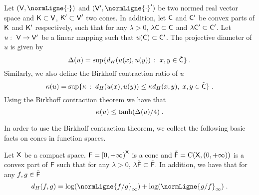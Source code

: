 \documentclass[11pt,a4paper]{article}
\providecommand{\DIFaddbegin}{} %
\providecommand{\DIFaddend}{} %
\begin{document}
Let $(\msv, \normLigne{\cdot})$ and $(\msv', \normLigne{\cdot}')$ be two normed
real vector space and $\mathsf{K} \subset \mathsf{V}$, $\mathsf{K}' \subset \mathsf{V}'$ two cones. In
addition, let $\mathsf{C}$ and $\mathsf{C}'$ be convex parts of $\mathsf{K}$ and 
$\mathsf{K}'$ respectively, such that for any $\lambda > 0$, $\lambda \mathsf{C} \subset \mathsf{C}$ and
$\lambda \mathsf{C}' \subset \mathsf{C}'$. Let $u: \ \mathsf{V} \to \mathsf{V}'$ be a linear mapping
such that $u(\mathsf{C}) \subset \mathsf{C}'$. The projective diameter of $u$ is given by
\begin{equation}
  \Delta(u) = \sup \ensembleLigne{d_H(u(x), u(y))}{x, y \in \tilde{\msc}} \DIFaddbegin \eqsp \DIFaddend . 
\end{equation}
Similarly, we also define the Birkhoff contraction ratio of $u$
\begin{equation}
  \kappa(u) = \sup \ensembleLigne{\kappa}{d_H(u(x), u(y)) \leq \kappa d_H(x,y), \eqsp x,y \in \tmsc} \DIFaddbegin \eqsp \DIFaddend . 
\end{equation}
Using the Birkhoff contraction theorem \citep{birkhoff1957extensions,bauer1965elementary,hopf1963inequality} we have that
\begin{equation}
  \label{eq:uno}
  \kappa(u) \leq \tanh(\Delta(u)/4) \DIFaddbegin \eqsp \DIFaddend . 
\end{equation}

In order to use the Birkhoff contraction theorem, we collect the following basic
facts on cones in function spaces.
\begin{proposition}
  \label{prop:hilbert_birkhoff}
  Let $\mathsf{X}$ be a compact space. $\mathsf{F} = \left[0,+\infty\right)^{\mathsf{X}}$ is a cone and
  $\tilde{\mathsf{F}} = \mathrm{C}(\mathsf{X}, \left(0,+\infty\right))$ is a convex part of $\mathsf{F}$ such that
  for any $\lambda > 0$, $\lambda \tilde{\mathsf{F}} \subset \tilde{\mathsf{F}}$. In addition, we have
  that for any $f, g \in \tilde{\mathsf{F}}$
  \begin{equation}
    d_H(f,g) = \log(\normLigne{f/g}_{\infty}) + \log(\normLigne{g/f}_{\infty}) \DIFaddbegin \eqsp \DIFaddend . 
  \end{equation}
\end{proposition}
\end{document}
